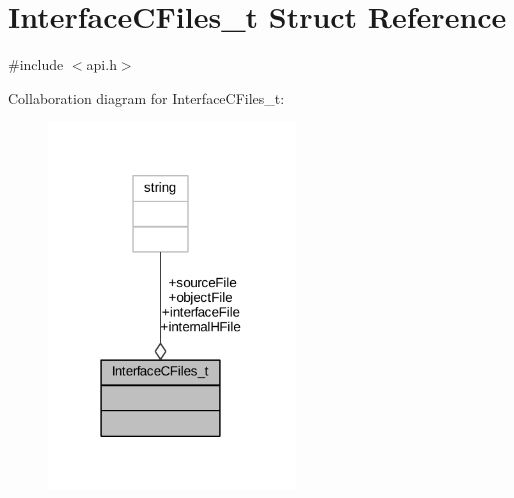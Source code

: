 \hypertarget{struct_interface_c_files__t}{}\section{Interface\+C\+Files\+\_\+t Struct Reference}
\label{struct_interface_c_files__t}


{\ttfamily \#include $<$api.\+h$>$}



Collaboration diagram for Interface\+C\+Files\+\_\+t\+:
\nopagebreak
\begin{figure}[H]
\begin{center}
\leavevmode
\includegraphics[width=186pt]{struct_interface_c_files__t__coll__graph}
\end{center}
\end{figure}
